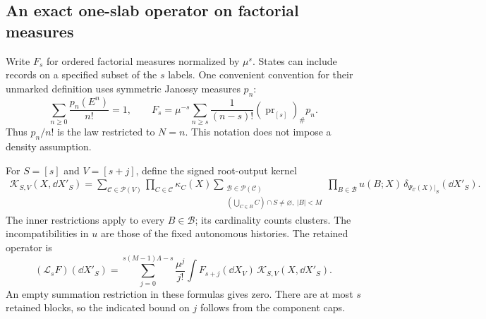 \subsection{An exact one-slab operator on factorial measures}

Write $F_s$ for ordered factorial measures normalized by $\mu^s$.
States can include records on a specified subset of the $s$ labels.
One convenient convention for their unmarked definition uses symmetric
Janossy measures $p_n$:
\begin{equation}\label{eq:janossy-factorial}
 \sum_{n\ge0}\frac{p_n(E^n)}{n!}=1,\qquad
 F_s=\mu^{-s}\sum_{n\ge s}\frac{1}{(n-s)!}
                (\operatorname{pr}_{[s]})_\#p_n.
\end{equation}
Thus $p_n/n!$ is the law restricted to $N=n$.  This notation does not
impose a density assumption.

For $S=[s]$ and $V=[s+j]$, define the signed root-output kernel
\begin{align}\label{eq:retained-kernel}
 \mathcal K_{S,V}(X,\dd X'_S)
 =\sum_{\mathcal C\in\mathcal P(V)}\prod_{C\in\mathcal C}\kappa_C(X)
 \sum_{\substack{\mathcal B\in\mathcal P(\mathcal C)\\
       (\bigcup_{C\in B}C)\cap S\ne\varnothing,\ |B|<M}}
    \prod_{B\in\mathcal B}u(B;X)\,
    \delta_{\Psi_{\mathcal C}(X)|_S}(\dd X'_S).
\end{align}
The inner restrictions apply to every $B\in\mathcal B$; its cardinality
counts clusters.  The incompatibilities in $u$ are those of the fixed
autonomous histories.  The retained operator is
\begin{equation}\label{eq:retained-operator}
 (\mathcal L_sF)(\dd X'_S)
   =\sum_{j=0}^{s(M-1)\Lambda-s}\frac{\mu^j}{j!}
       \int F_{s+j}(\dd X_V)\,
                       \mathcal K_{S,V}(X,\dd X'_S).
\end{equation}
An empty summation restriction in these formulas gives zero.  There are
at most $s$ retained blocks, so the indicated bound on $j$ follows from
the component caps.

